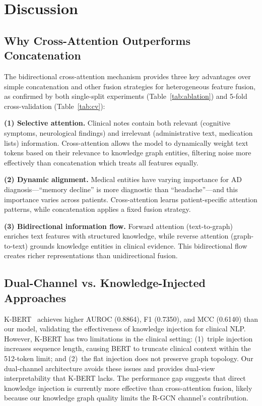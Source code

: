 \documentclass[11pt,onecolumn,a4paper]{article}
\begin{document}
\section{Discussion}
\label{sec:discussion}

\subsection{Why Cross-Attention Outperforms Concatenation}

The bidirectional cross-attention mechanism provides three key advantages over simple concatenation and other fusion strategies for heterogeneous feature fusion, as confirmed by both single-split experiments (Table~\ref{tab:ablation}) and 5-fold cross-validation (Table~\ref{tab:cv}):

\textbf{(1) Selective attention.} Clinical notes contain both relevant (cognitive symptoms, neurological findings) and irrelevant (administrative text, medication lists) information. Cross-attention allows the model to dynamically weight text tokens based on their relevance to knowledge graph entities, filtering noise more effectively than concatenation which treats all features equally.

\textbf{(2) Dynamic alignment.} Medical entities have varying importance for AD diagnosis---``memory decline'' is more diagnostic than ``headache''---and this importance varies across patients. Cross-attention learns patient-specific attention patterns, while concatenation applies a fixed fusion strategy.

\textbf{(3) Bidirectional information flow.} Forward attention (text-to-graph) enriches text features with structured knowledge, while reverse attention (graph-to-text) grounds knowledge entities in clinical evidence. This bidirectional flow creates richer representations than unidirectional fusion.

\subsection{Dual-Channel vs. Knowledge-Injected Approaches}

K-BERT~\cite{liu2020kbert} achieves higher AUROC (0.8864), F1 (0.7350), and MCC (0.6140) than our model, validating the effectiveness of knowledge injection for clinical NLP. However, K-BERT has two limitations in the clinical setting: (1)~triple injection increases sequence length, causing BERT to truncate clinical context within the 512-token limit; and (2)~the flat injection does not preserve graph topology. Our dual-channel architecture avoids these issues and provides dual-view interpretability that K-BERT lacks. The performance gap suggests that direct knowledge injection is currently more effective than cross-attention fusion, likely because our knowledge graph quality limits the R-GCN channel's contribution.
\end{document}
